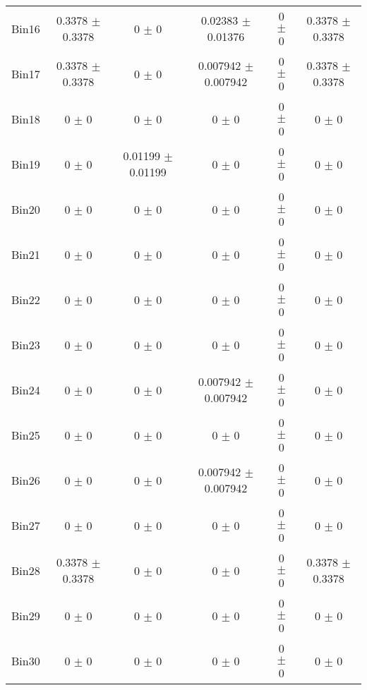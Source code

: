 \begin{tabular}{@{\extracolsep{4pt}}lccccc@{}}
     Bin16 & 0.3378 $\pm$ 0.3378 & 0 $\pm$ 0 & 0.02383 $\pm$ 0.01376 & 0 $\pm$ 0 & 0.3378 $\pm$ 0.3378 \\ 
     Bin17 & 0.3378 $\pm$ 0.3378 & 0 $\pm$ 0 & 0.007942 $\pm$ 0.007942 & 0 $\pm$ 0 & 0.3378 $\pm$ 0.3378 \\ 
     Bin18 & 0 $\pm$ 0 & 0 $\pm$ 0 & 0 $\pm$ 0 & 0 $\pm$ 0 & 0 $\pm$ 0 \\ 
     Bin19 & 0 $\pm$ 0 & 0.01199 $\pm$ 0.01199 & 0 $\pm$ 0 & 0 $\pm$ 0 & 0 $\pm$ 0 \\ 
     Bin20 & 0 $\pm$ 0 & 0 $\pm$ 0 & 0 $\pm$ 0 & 0 $\pm$ 0 & 0 $\pm$ 0 \\ 
     Bin21 & 0 $\pm$ 0 & 0 $\pm$ 0 & 0 $\pm$ 0 & 0 $\pm$ 0 & 0 $\pm$ 0 \\ 
     Bin22 & 0 $\pm$ 0 & 0 $\pm$ 0 & 0 $\pm$ 0 & 0 $\pm$ 0 & 0 $\pm$ 0 \\ 
     Bin23 & 0 $\pm$ 0 & 0 $\pm$ 0 & 0 $\pm$ 0 & 0 $\pm$ 0 & 0 $\pm$ 0 \\ 
     Bin24 & 0 $\pm$ 0 & 0 $\pm$ 0 & 0.007942 $\pm$ 0.007942 & 0 $\pm$ 0 & 0 $\pm$ 0 \\ 
     Bin25 & 0 $\pm$ 0 & 0 $\pm$ 0 & 0 $\pm$ 0 & 0 $\pm$ 0 & 0 $\pm$ 0 \\ 
     Bin26 & 0 $\pm$ 0 & 0 $\pm$ 0 & 0.007942 $\pm$ 0.007942 & 0 $\pm$ 0 & 0 $\pm$ 0 \\ 
     Bin27 & 0 $\pm$ 0 & 0 $\pm$ 0 & 0 $\pm$ 0 & 0 $\pm$ 0 & 0 $\pm$ 0 \\ 
     Bin28 & 0.3378 $\pm$ 0.3378 & 0 $\pm$ 0 & 0 $\pm$ 0 & 0 $\pm$ 0 & 0.3378 $\pm$ 0.3378 \\ 
     Bin29 & 0 $\pm$ 0 & 0 $\pm$ 0 & 0 $\pm$ 0 & 0 $\pm$ 0 & 0 $\pm$ 0 \\ 
     Bin30 & 0 $\pm$ 0 & 0 $\pm$ 0 & 0 $\pm$ 0 & 0 $\pm$ 0 & 0 $\pm$ 0 \\ 
\hline\hline
  \end{tabular}
